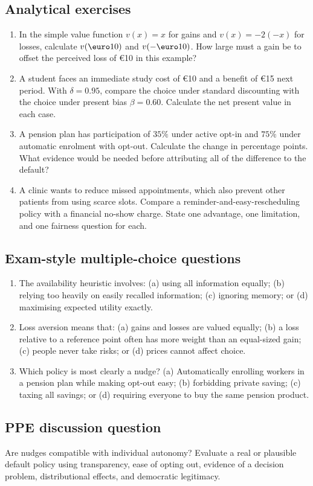 \subsection*{Analytical exercises}
\begin{enumerate}[resume,label=\arabic*.]
  \item In the simple value function \(v(x)=x\) for gains and \(v(x)=-2(-x)\) for losses, calculate \(v(\text{\euro10})\) and \(v(-\text{\euro10})\). How large must a gain be to offset the perceived loss of \euro10 in this example?
  \item A student faces an immediate study cost of \euro10 and a benefit of \euro15 next period. With \(\delta=0.95\), compare the choice under standard discounting with the choice under present bias \(\beta=0.60\). Calculate the net present value in each case.
  \item A pension plan has participation of \(35\%\) under active opt-in and \(75\%\) under automatic enrolment with opt-out. Calculate the change in percentage points. What evidence would be needed before attributing all of the difference to the default?
  \item A clinic wants to reduce missed appointments, which also prevent other patients from using scarce slots. Compare a reminder-and-easy-rescheduling policy with a financial no-show charge. State one advantage, one limitation, and one fairness question for each.
\end{enumerate}

\subsection*{Exam-style multiple-choice questions}
\begin{enumerate}[resume,label=\arabic*.]
  \item The availability heuristic involves: (a) using all information equally; (b) relying too heavily on easily recalled information; (c) ignoring memory; or (d) maximising expected utility exactly.
  \item Loss aversion means that: (a) gains and losses are valued equally; (b) a loss relative to a reference point often has more weight than an equal-sized gain; (c) people never take risks; or (d) prices cannot affect choice.
  \item Which policy is most clearly a nudge? (a) Automatically enrolling workers in a pension plan while making opt-out easy; (b) forbidding private saving; (c) taxing all savings; or (d) requiring everyone to buy the same pension product.
\end{enumerate}

\subsection*{PPE discussion question}

\noindent Are nudges compatible with individual autonomy? Evaluate a real or
plausible default policy using transparency, ease of opting out, evidence of a
decision problem, distributional effects, and democratic legitimacy.

